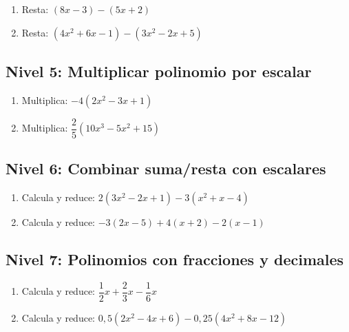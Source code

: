 \documentclass[12pt, letterpaper]{article}
\begin{document}
\begin{enumerate}[leftmargin=*, resume]
  \item \facil{} Resta: $(8x - 3) - (5x + 2)$

  \item \medio{} Resta: $(4x^2 + 6x - 1) - (3x^2 - 2x + 5)$
\end{enumerate}

\subsection*{Nivel 5: Multiplicar polinomio por escalar}

\begin{enumerate}[leftmargin=*, resume]
  \item \facil{} Multiplica: $-4(2x^2 - 3x + 1)$

  \item \medio{} Multiplica: $\dfrac{2}{5}(10x^3 - 5x^2 + 15)$
\end{enumerate}

\subsection*{Nivel 6: Combinar suma/resta con escalares}

\begin{enumerate}[leftmargin=*, resume]
  \item \medio{} Calcula y reduce: $2(3x^2 - 2x + 1) - 3(x^2 + x - 4)$

  \item \medio{} Calcula y reduce: $-3(2x - 5) + 4(x + 2) - 2(x - 1)$
\end{enumerate}

\subsection*{Nivel 7: Polinomios con fracciones y decimales}

\begin{enumerate}[leftmargin=*, resume]
  \item \dificil{} Calcula y reduce: $\dfrac{1}{2}x + \dfrac{2}{3}x - \dfrac{1}{6}x$

  \item \dificil{} Calcula y reduce: $0{,}5(2x^2 - 4x + 6) - 0{,}25(4x^2 + 8x - 12)$
\end{enumerate}

\newpage

\ifmwclaves
\end{document}
